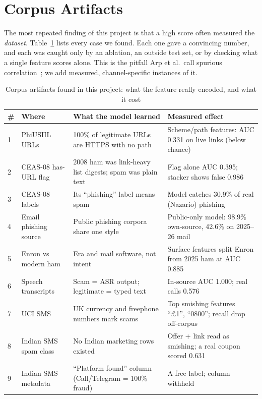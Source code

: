 \documentclass[conference]{IEEEtran}
\begin{document}
\section{Corpus Artifacts}\label{sec:artifacts}

The most repeated finding of this project is that a high score often measured
the \emph{dataset}. Table~\ref{tab:artifacts} lists every case we found. Each one
gave a convincing number, and each was caught only by an ablation, an
outside test set, or by checking what a single feature scores alone. This is the
pitfall Arp et al.\ call spurious correlation~\cite{arp2022dos}; we add
measured, channel-specific instances of it.

\begin{table}[t]
\caption{Corpus artifacts found in this project: what the feature really encoded, and what it cost}
\label{tab:artifacts}
\centering\footnotesize
\setlength{\tabcolsep}{4pt}
\begin{tabular}{@{}p{0.3cm}p{3.1cm}p{6.6cm}p{6.6cm}@{}}
\toprule
\# & Where & What the model learned & Measured effect \\
\midrule
1 & PhiUSIIL URLs & 100\% of legitimate URLs are HTTPS with no path & Scheme/path features: AUC 0.331 on live links (below chance) \\
2 & CEAS-08 has-URL flag & 2008 ham was link-heavy list digests; spam was plain text & Flag alone AUC 0.395; stacker shows false 0.986 \\
3 & CEAS-08 labels & Its ``phishing'' label means spam & Model catches 30.9\% of real (Nazario) phishing \\
4 & Email phishing source & Public phishing corpora share one style & Public-only model: 98.9\% own-source, 42.6\% on 2025--26 mail \\
5 & Enron vs modern ham & Era and mail software, not intent & Surface features split Enron from 2025 ham at AUC 0.885 \\
6 & Speech transcripts & Scam = ASR output; legitimate = typed text & In-source AUC 1.000; real calls 0.576 \\
7 & UCI SMS & UK currency and freephone numbers mark scams & Top smishing features ``\pounds1'', ``0800''; recall drop off-corpus \\
8 & Indian SMS spam class & No Indian marketing rows existed & Offer + link read as smishing; a real coupon scored 0.631 \\
9 & Indian SMS metadata & ``Platform found'' column (Call/Telegram = 100\% fraud) & A free label; column withheld \\

\end{tabular}
\end{table}
\end{document}
